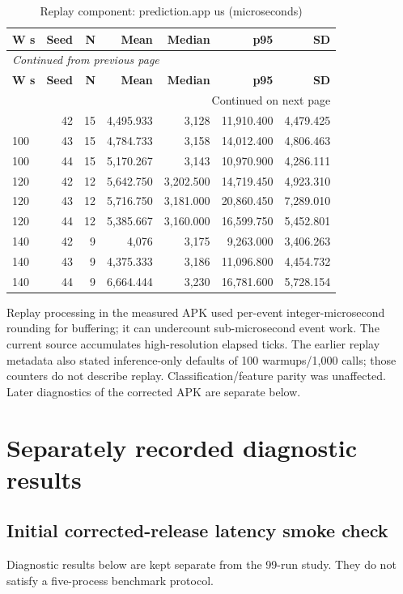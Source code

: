\documentclass[10pt,a4paper]{article}
\begin{document}
\begin{longtable}{@{}lrrrrrr@{}}
\caption{Replay component:\allowbreak{} prediction.app us (microseconds)}\\
\toprule
\textbf{W s} & \textbf{Seed} & \textbf{N} & \textbf{Mean} & \textbf{Median} & \textbf{p95} & \textbf{SD} \\
\midrule\endfirsthead
\multicolumn{7}{l}{\small\itshape Continued from previous page}\\
\toprule
\textbf{W s} & \textbf{Seed} & \textbf{N} & \textbf{Mean} & \textbf{Median} & \textbf{p95} & \textbf{SD} \\
\midrule\endhead
\midrule\multicolumn{7}{r}{\small Continued on next page}\\\endfoot
\bottomrule\endlastfoot
100 & 42 & 15 & 4,495.933 & 3,128 & 11,910.400 & 4,479.425 \\
100 & 43 & 15 & 4,784.733 & 3,158 & 14,012.400 & 4,806.463 \\
100 & 44 & 15 & 5,170.267 & 3,143 & 10,970.900 & 4,286.111 \\
120 & 42 & 12 & 5,642.750 & 3,202.500 & 14,719.450 & 4,923.310 \\
120 & 43 & 12 & 5,716.750 & 3,181.000 & 20,860.450 & 7,289.010 \\
120 & 44 & 12 & 5,385.667 & 3,160.000 & 16,599.750 & 5,452.801 \\
140 & 42 & 9 & 4,076 & 3,175 & 9,263.000 & 3,406.263 \\
140 & 43 & 9 & 4,375.333 & 3,186 & 11,096.800 & 4,454.732 \\
140 & 44 & 9 & 6,664.444 & 3,230 & 16,781.600 & 5,728.154 \\
\end{longtable}\endgroup
Replay processing in the measured APK used per-event integer-microsecond rounding for buffering; it can undercount sub-microsecond event work. The current source accumulates high-resolution elapsed ticks. The earlier replay metadata also stated inference-only defaults of 100 warmups/\allowbreak{}1,000 calls; those counters do not describe replay. Classification/\allowbreak{}feature parity was unaffected. Later diagnostics of the corrected APK are separate below.

\section{Separately recorded diagnostic results}
\subsection{Initial corrected-release latency smoke check}
Diagnostic results below are kept separate from the 99-run study. They do not satisfy a five-process benchmark protocol.
\end{document}
